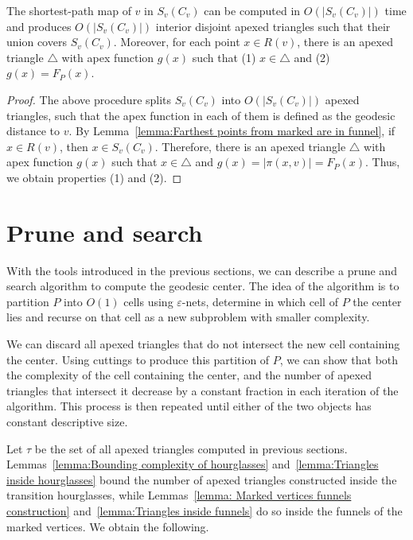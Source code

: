 \documentclass[a4paper,UKenglish]{lipics}
\newcommand{\F}[2]{\ensuremath{F_{\scriptscriptstyle #1}(#2)}}
\newcommand{\fn}[2]{\ensuremath{S_{\scriptscriptstyle #1}(#2)}}
\newcommand{\g}[2]{\ensuremath{|\pi(#1, #2)|}}
\begin{document}
\begin{lemma}\label{lemma:Triangles inside funnels}
The shortest-path map of $v$ in $\fn{v}{C_v}$ can be computed in $O(|\fn{v}{C_v}|)$ time and produces $O(|\fn{v}{C_v}|)$ interior disjoint apexed triangles such that their union covers $\fn{v}{C_v}$. 
Moreover, for each point $x\in R(v)$,  
there is an apexed triangle $\triangle$ with apex function $g(x)$ such that 
(1) $x\in \triangle$ and (2) $g(x) = \F{P}{x}$.
\end{lemma}
\begin{proof}
The above procedure splits $\fn{v}{C_v}$ into $O(|\fn{v}{C_v}|)$ apexed triangles, such that the apex function in each of them is defined as the geodesic distance to $v$. 
By Lemma~\ref{lemma:Farthest points from marked are in funnel}, if $x\in R(v)$, then $x\in \fn{v}{C_v}$. 
Therefore, there is an apexed triangle $\triangle$ with apex function $g(x)$ such that $x\in \triangle$ and $g(x) = \g{x}{v} = \F{P}{x}$. Thus, we obtain properties (1) and (2).
\end{proof}

\section{Prune and search}\label{section:Prune and search}
With the tools introduced in the previous sections, we can describe a prune and search algorithm to compute the geodesic center. 
The idea of the algorithm is to partition $P$ into $O(1)$ cells using $\varepsilon$-nets, determine in which cell of $P$ the center lies and recurse on that cell as a new subproblem with smaller complexity.

We can discard all apexed triangles that do not intersect the new cell containing the center. Using cuttings to produce this partition of $P$, we can show that both the complexity of the cell containing the center, and the number of apexed triangles that intersect it decrease by a constant fraction in each iteration of the algorithm. This process is then repeated until either of the two objects has constant descriptive size. 

Let $\tau$ be the set of all apexed triangles computed in previous sections. 
Lemmas~\ref{lemma:Bounding complexity of hourglasses} and~\ref{lemma:Triangles inside hourglasses} bound the number of apexed triangles constructed inside the transition hourglasses, while Lemmas~\ref{lemma: Marked vertices funnels construction} and~\ref{lemma:Triangles inside funnels} do so inside the funnels of the marked vertices. We obtain the following.
\end{document}
